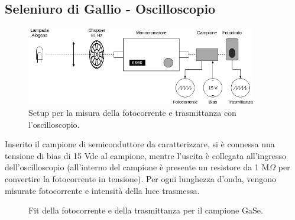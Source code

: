 \documentclass[11pt]{article} %
\begin{document}
\subsection{Seleniuro di Gallio - Oscilloscopio}
\begin{figure}[h!]
\begin{center}
\includegraphics[width=380px]{img/foto_osc.png}
\caption{Setup per la misura della fotocorrente e trasmittanza con l'oscilloscopio.}
\end{center}
\end{figure}
Inserito il campione di semiconduttore da caratterizzare, si è connessa una tensione di bias di 15 Vdc al campione, mentre l'uscita è collegata all'ingresso dell'oscilloscopio (all'interno del campione è presente un resistore da 1 M$\Omega$ per convertire la fotocorrente in tensione). Per ogni lunghezza d'onda, vengono misurate fotocorrente e intensità della luce trasmessa.
\begin{figure}[!h]
\centering
\caption{Fit della fotocorrente e della trasmittanza per il campione GaSe.}
\end{figure}
\end{document}
